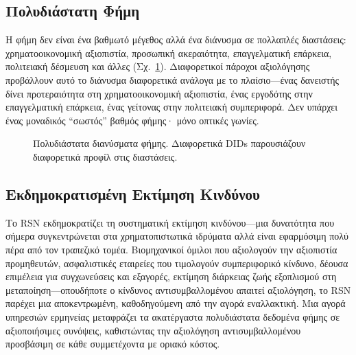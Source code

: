 \documentclass[11pt,a4paper,twocolumn]{article}
\begin{document}
\subsection{Πολυδιάστατη Φήμη}

Η φήμη δεν είναι ένα βαθμωτό μέγεθος αλλά ένα διάνυσμα σε πολλαπλές διαστάσεις: χρηματοοικονομική αξιοπιστία, προσωπική ακεραιότητα, επαγγελματική επάρκεια, πολιτειακή δέσμευση και άλλες (Σχ.~\ref{fig:reputation-radar}). Διαφορετικοί πάροχοι αξιολόγησης προβάλλουν αυτό το διάνυσμα διαφορετικά ανάλογα με το πλαίσιο---ένας δανειστής δίνει προτεραιότητα στη χρηματοοικονομική αξιοπιστία, ένας εργοδότης στην επαγγελματική επάρκεια, ένας γείτονας στην πολιτειακή συμπεριφορά. Δεν υπάρχει ένας μοναδικός ``σωστός'' βαθμός φήμης· μόνο οπτικές γωνίες.

\begin{figure}[ht]
\centering
{}
\caption{Πολυδιάστατα διανύσματα φήμης. Διαφορετικά DIDs παρουσιάζουν διαφορετικά προφίλ στις διαστάσεις.}
\label{fig:reputation-radar}
\end{figure}

\subsection{Εκδημοκρατισμένη Εκτίμηση Κινδύνου}

Το RSN εκδημοκρατίζει τη συστηματική εκτίμηση κινδύνου---μια δυνατότητα που σήμερα συγκεντρώνεται στα χρηματοπιστωτικά ιδρύματα αλλά είναι εφαρμόσιμη πολύ πέρα από τον τραπεζικό τομέα. Βιομηχανικοί όμιλοι που αξιολογούν την αξιοπιστία προμηθευτών, ασφαλιστικές εταιρείες που τιμολογούν συμπεριφορικό κίνδυνο, δέουσα επιμέλεια για συγχωνεύσεις και εξαγορές, εκτίμηση διάρκειας ζωής εξοπλισμού στη μεταποίηση---οπουδήποτε ο κίνδυνος αντισυμβαλλομένου απαιτεί αξιολόγηση, το RSN παρέχει μια αποκεντρωμένη, καθοδηγούμενη από την αγορά εναλλακτική. Μια αγορά υπηρεσιών ερμηνείας μεταφράζει τα ακατέργαστα πολυδιάστατα δεδομένα φήμης σε αξιοποιήσιμες συνόψεις, καθιστώντας την αξιολόγηση αντισυμβαλλομένου προσβάσιμη σε κάθε συμμετέχοντα με οριακό κόστος.
\end{document}
